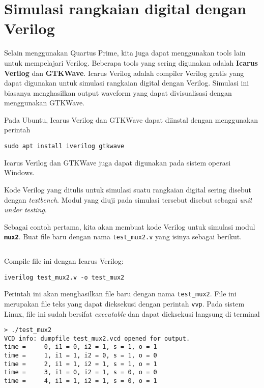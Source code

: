 \section{Simulasi rangkaian digital dengan Verilog}

Selain menggunakan Quartus Prime, kita juga dapat menggunakan tools lain untuk
mempelajari Verilog. Beberapa tools yang sering digunakan
adalah \textbf{Icarus Verilog} dan \textbf{GTKWave}. Icarus
Verilog adalah compiler Verilog gratis yang dapat digunakan
untuk simulasi rangkaian digital dengan Verilog. Simulasi ini
biasanya menghasilkan output waveform yang dapat divisualisasi dengan
menggunakan GTKWave.

Pada Ubuntu, Icarus Verilog dan GTKWave dapat diinstal dengan menggunakan perintah
\begin{verbatim}
sudo apt install iverilog gtkwave
\end{verbatim}
Icarus Verilog dan GTKWave juga dapat digunakan pada sistem operasi Windows.

Kode Verilog yang ditulis untuk simulasi suatu rangkaian digital sering
disebut dengan \textit{textbench}. Modul yang diuji pada simulasi tersebut
disebut sebagai \textit{unit under testing}.

Sebagai contoh pertama, kita akan membuat kode Verilog untuk simulasi
modul {\tt\textbf{mux2}}. Buat file baru dengan nama {\tt test\_mux2.v}
yang isinya sebagai berikut.
\begin{mdframed}[backgroundcolor=mintedbg]
{
\inputminted[breaklines,fontsize=\small]{verilog}{codes/test_mux2.v}
}\end{mdframed}

Compile file ini dengan Icarus Verilog:
\begin{verbatim}
iverilog test_mux2.v -o test_mux2
\end{verbatim}

Perintah ini akan menghasilkan file baru dengan nama {\tt\small test\_mux2}.
File ini merupakan file teks yang dapat dieksekusi dengan perintah {\tt vvp}.
Pada sistem Linux, file ini sudah bersifat \textit{executable} dan dapat dieksekusi
langsung di terminal
\begin{verbatim}
> ./test_mux2
VCD info: dumpfile test_mux2.vcd opened for output.
time =     0, i1 = 0, i2 = 1, s = 1, o = 1
time =     1, i1 = 1, i2 = 0, s = 1, o = 0
time =     2, i1 = 1, i2 = 1, s = 1, o = 1
time =     3, i1 = 0, i2 = 1, s = 0, o = 0
time =     4, i1 = 1, i2 = 1, s = 0, o = 1
\end{verbatim}


